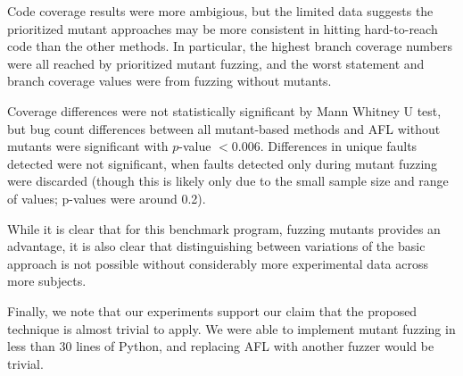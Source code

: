 Code coverage results were more ambigious, but the limited data
suggests the prioritized mutant approaches may be more consistent in
hitting hard-to-reach code than the other methods.  In particular, the highest branch coverage numbers were all reached by prioritized mutant fuzzing, and the worst statement and branch coverage values were from fuzzing without mutants.

Coverage differences were not statistically significant by Mann
Whitney U test, but bug count differences between all mutant-based methods and AFL
without mutants were significant with $p$-value $< 0.006$.
Differences in unique faults detected were not significant, when
faults detected only during mutant fuzzing were discarded (though this
is likely only due to the small sample size and range of values;
p-values were around 0.2).

While it is clear that for this benchmark program, fuzzing mutants
provides an advantage, it is also clear that distinguishing between
variations of the basic approach is not possible without considerably
more experimental data across more subjects.

Finally, we note that our experiments support our claim that the proposed technique is almost trivial to apply. We were able to implement mutant fuzzing in less than 30 lines of Python, and replacing AFL with another fuzzer would be trivial.
